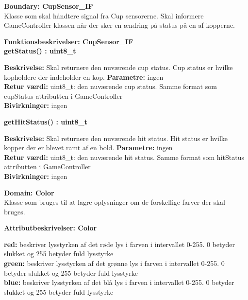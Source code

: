 \documentclass[Arkitektur/System_main.tex]{subfiles}
\begin{document}
{\large\textbf{Boundary:  CupSensor\_IF}}\\
Klasse som skal håndtere signal fra Cup sensorerne. Skal informere GameController klassen når der sker en ændring på status på en af kopperne.

{\large\textbf{Funktionsbeskrivelser: CupSensor\_IF}}\\[0.2cm]
\textbf{getStatus() : uint8\_t}
\begin{adjustwidth}{1cm}{0pt}
\textbf{Beskrivelse:} Skal returnere den nuværende cup status. Cup status er hvilke kopholdere der indeholder en kop.
\textbf{Parametre:} ingen \\[0.2cm]
\textbf{Retur værdi:} uint8\_t: den nuværende cup status. Samme format som cupStatus attributten i GameController \\[0.2cm]
\textbf{Bivirkninger:} ingen \\[0.2cm]
\end{adjustwidth}

\textbf{getHitStatus() : uint8\_t}
\begin{adjustwidth}{1cm}{0pt}
\textbf{Beskrivelse:} Skal returnere den nuværende hit status. Hit status er hvilke kopper der er blevet ramt af en bold.
\textbf{Parametre:} ingen \\[0.2cm]
\textbf{Retur værdi:} uint8\_t: den nuværende hit status. Samme format som hitStatus attributten i GameController \\[0.2cm]
\textbf{Bivirkninger:} ingen \\[0.2cm]
\end{adjustwidth}


{\large\textbf{Domain:  Color}}\\
Klasse som bruges til at lagre oplysninger om de forskellige farver der skal bruges.  

{\large\textbf{Attributbeskrivelser: Color}}
\begin{adjustwidth}{1cm}{0pt}
\textbf{red:} beskriver lysstyrken af det røde lys i farven i intervallet 0-255. 0 betyder slukket og 255 betyder fuld lysstyrke \\[0.2cm]
\textbf{green:} beskriver lysstyrken af det grønne lys i farven i intervallet 0-255. 0 betyder slukket og 255 betyder fuld lysstyrke \\[0.2cm]
\textbf{blue:} beskriver lysstyrken af det blå lys i farven i intervallet 0-255. 0 betyder slukket og 255 betyder fuld lysstyrke \\[0.2cm]
\end{adjustwidth}
\end{document}
